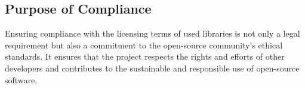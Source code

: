 \subsection{Purpose of Compliance}
Ensuring compliance with the licensing terms of used libraries is not only a legal requirement but also a commitment to the open-source community's ethical standards. It ensures that the project respects the rights and efforts of other developers and contributes to the sustainable and responsible use of open-source software.